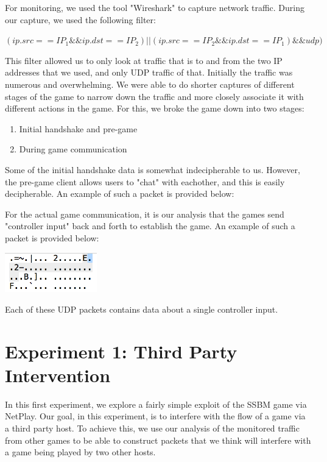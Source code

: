 \documentclass[conference]{IEEEtran}
\begin{document}
For monitoring, we used the tool "Wireshark" to capture network traffic. During our capture, we used the following filter:

$ ( ip.src == IP_1 \&\& ip.dst == IP_2 ) || (ip.src == IP_2 \&\& ip.dst == IP_1) \&\& udp) $

\vspace{0.3cm}
This filter allowed us to only look at traffic that is to and from the two IP addresses that we used, and only UDP traffic of that.
Initially the traffic was numerous and overwhelming.
We were able to do shorter captures of different stages of the game to narrow down the traffic and more closely associate it with different actions in the game.
For this, we broke the game down into two stages:
\begin{enumerate}  
\item Initial handshake and pre-game
\item During game communication
\end{enumerate}
\vspace{0.5cm}

Some of the initial handshake data is somewhat indecipherable to us. 
However, the pre-game client allows users to "chat" with eachother, and this is easily decipherable. 
An example of such a packet is provided below:
\vspace{0.5cm}

For the actual game communication, it is our analysis that the games send "controller input" back and forth to establish the game. An example of such a packet is provided below:
\vspace{0.5cm}
\begin{center}
\includegraphics[width=4cm]{Figures/Packet}
\end{center}
\vspace{0.5cm}

Each of these UDP packets contains data about a single controller input.
\section{Experiment 1: Third Party Intervention}
In this first experiment, we explore a fairly simple exploit of the SSBM game via NetPlay.
Our goal, in this experiment, is to interfere with the flow of a game via a third party host.
To achieve this, we use our analysis of the monitored traffic from other games to be able to construct packets that we think will interfere with a game being played by two other hosts. 
\end{document}
